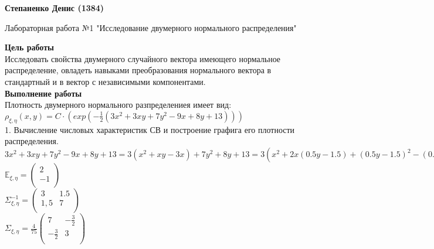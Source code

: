 \documentclass{article}
\begin{document}
\textbf{Степаненко Денис (1384)}

\begin{center}
Лабораторная работа №1 "Исследование двумерного нормального распределения"\\
\end{center}

\textbf{Цель работы}\\
Исследовать свойства двумерного случайного вектора имеющего нормальное распределение, овладеть навыками преобразования нормального вектора в стандартный и в вектор с независимыми компонентами.\\


\textbf{Выполнение работы}\\
Плотность двумерного нормального разпределениея имеет вид:
$\rho_{\xi,\eta}(x,y)=C\cdot(exp(-\frac{1}{2}(3x^2+3xy+7y^2-9x+8y+13)))$\\

1. Вычисление числовых характеристик СВ и построение графига его плотности распределения.\\
 
$3x^2+3xy+7y^2-9x+8y+13 = 3(x^2+xy-3x)+7y^2+8y+13
=3(x^2+2x(0.5y-1.5)+(0.5y-1.5)^2-(0.5y-1.5)^2)+7y^2+8y+13
=3(x+0.5y-1.5)^2+7y^2+8y+13-\frac{3y^2}{4}+\frac{9y}{2}+\frac{27}{4}
=3(x+0.5y-1.5)^2+\frac{25y^2+(32+18)y+(13\cdot14-27)}{4}
=3(x+0.5y-1.5)^2+\frac{25y^2+50y+25}{4}
=3(x+0.5y-1.5)^2+\frac{25}{4}(y+1)^2
=3(x+\frac{1}{2}(y+1)-2)^2+\frac{25}{4}(y+1)^2
=3[(x-2)^2+\frac{2}{2}(y+1)(x-2)+\frac{1}{4}(y+1)^2]+\frac{25}{4}(y+1)^2
=3(x-2)^2+3(x-2)(y+1)+7(y+1)$\\

$\mathbb{E}_{\xi,\eta}=\left({\begin{array}{c}
    2\\
    -1\\
  \end{array} } \right)$\\
  
$\Sigma_{\xi,\eta}^{-1}=\left({\begin{array}{cc}
    3 & 1.5\\
    1,5 & 7\\
  \end{array} } \right)$\\

$\Sigma_{\xi,\eta}=\frac{4}{75}\left({\begin{array}{cc}
    7 & -\frac{3}{2}\\
     -\frac{3}{2} & 3\\
  \end{array} } \right)$\\
\end{document}
